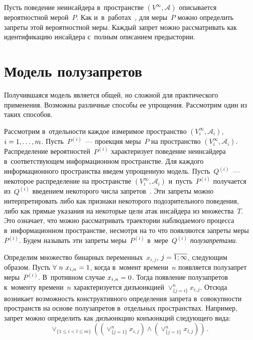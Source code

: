 \begin{multicols}{2}
  Пусть поведение неинсайдера в~пространстве $(V^\infty, \mathcal{A})$ 
описывается вероятностной мерой~$P$. Как и~в~работах~\cite{4-gr, 9-gr}, для 
меры~$P$ можно определить запреты этой вероятностной меры. Каждый 
запрет можно рассматривать как идентификацию инсайдера с~полным 
описанием предыстории. 
  
\section{Модель полузапретов}

  Получившаяся модель является общей, но сложной для практического 
применения. Возможны различные способы ее упрощения. Рассмотрим один из 
таких способов.
  
  Рассмотрим в~отдельности каждое измеримое пространство $(V_i^\infty, 
\mathcal{A}_i)$, $i\hm= 1,\ldots , m$. Пусть~$P^{(i)}$~--- проекция меры~$P$ 
на пространство $(V_i^\infty, \mathcal{A}_i)$. Распределение 
вероятностей~$P^{(i)}$ характеризует поведе\-ние неинсайдера 
в~соответствующем информационном пространстве. Для каждого 
информационного пространства введем упрощенную\linebreak
 модель. 
Пусть~$Q^{(i)}$~--- некоторое распределение на пространстве $(V_i^\infty, 
\mathcal{A}_i)$ и~пусть~$P^{(i)}$ получается из~$Q^{(i)}$ введением 
некоторого числа запретов~\cite{10-gr}. Эти запреты можно интерпретировать 
либо как признаки некоторого подозрительного поведения, либо как прямые 
указания на некоторые цели атак инсайдера из множества~$T$. Это означает, 
что можно рассматривать траектории наблюдаемого процесса 
в~информационном пространстве, несмотря на то что появляются запреты 
меры~$P^{(i)}$. Будем называть эти запреты меры~$P^{(i)}$ в~мере~$Q^{(i)}$ 
\textit{полузапретами}. 
  
  Определим множество бинарных переменных~$x_{i,j}$, 
$j\hm=\overline{1;\infty}$, следующим образом. Пусть $\forall\ n\ x_{i,n}\hm=1$, 
когда в~момент времени~$n$ появляется полузапрет меры~$P^{(i)}$. 
В~противном случае $x_{i,n}\hm=0$. Тогда появление полузапретов к~моменту 
времени~$n$ характеризуется дизъюнкцией $\vee^n_{\{j=i\}} x_{i,j}$. Отсюда 
возникает возможность конструктивного определения запрета в~совокупности 
пространств на основе полузапретов в~отдельных пространствах. Например, 
запрет можно определить как дизъюнкцию конъюнкций следующего вида:
  $$
  \vee_{\{1\leq i<l\leq m\}} \left( \left( \vee^n_{\{j=1\}} x_{i,j}\right) \wedge 
\left( \vee^n_{\{j=1\}} x_{l,j}\right)\right)\,.
  $$
  

\end{multicols}
